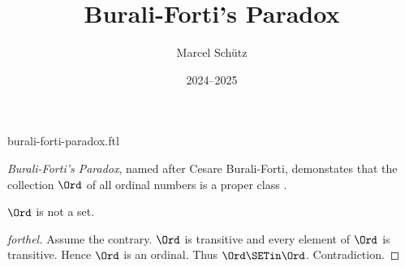 \documentclass{article}
\title{Burali-Forti's Paradox}
\author{Marcel Schütz}
\date{2024--2025}
\begin{document}
\begin{smodule}{burali-forti-paradox.ftl}
\maketitle


\noindent \emph{Burali-Forti's Paradox}, named after Cesare Burali-Forti, 
demonstates that the collection $\Ord$ of all ordinal numbers is a
proper class \cite{BuraliForti1897}.

\begin{theorem}[forthel,title=Burali-Forti's Paradox,id=burali_forti_paradox]
  $\Ord$ is not a set.
\end{theorem}
\begin{proof}[forthel]
  Assume the contrary.
  $\Ord$ is transitive and every element of $\Ord$ is transitive.
  Hence $\Ord$ is an ordinal.
  Thus $\Ord \SETin \Ord$.
  Contradiction.
\end{proof}

\printbibliography
{}
\end{smodule}
\end{document}
